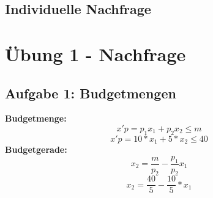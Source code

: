 \documentclass[a4paper, 10pt]{article}
\begin{document}
\subsection{Individuelle Nachfrage}

\section{Übung 1 - Nachfrage}
\subsection{Aufgabe 1: Budgetmengen}
\textbf{Budgetmenge:}
\begin{equation}
     x'p = p_1 x_1 + p_2 x_2 \leq m
\end{equation}
\begin{equation}
    x'p = 10 * x_1 + 5 * x_2 \leq 40
\end{equation}
\textbf{Budgetgerade:}
\begin{equation}
    x_2 = \frac{m}{p_2} - \frac{p_1}{p_2}x_1
\end{equation}
\begin{equation}
    x_2 = \frac{40}{5} - \frac{10}{5} * x_1
\end{equation}
\end{document}
